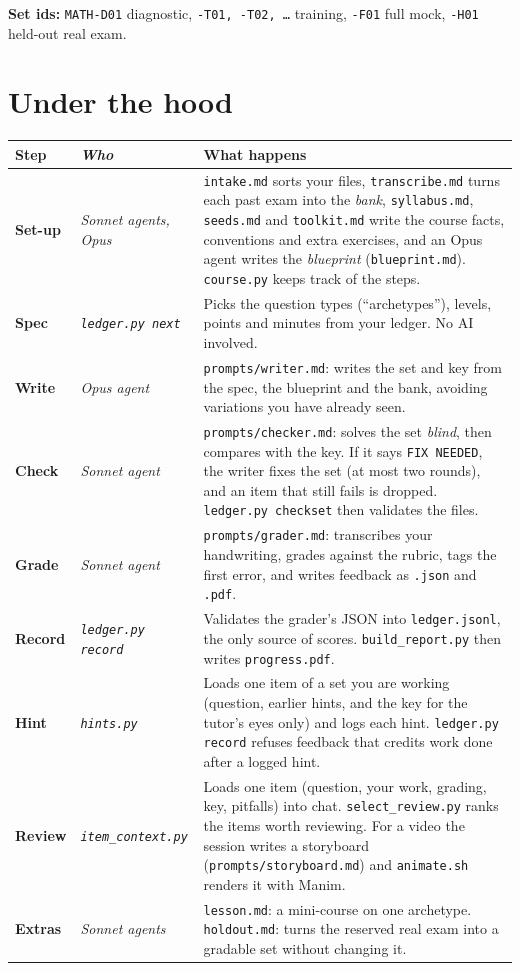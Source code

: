 \documentclass[a4paper,10pt]{article}
\begin{document}
\smallskip
\textbf{Set ids:} \texttt{MATH-D01} diagnostic, \texttt{-T01, -T02, \dots} training,
\texttt{-F01} full mock, \texttt{-H01} held-out real exam.

\section{Under the hood}

\begin{tabularx}{\linewidth}{@{}>{\bfseries}l >{\itshape}l X@{}}
\toprule
Step & Who & What happens \\
\midrule
Set-up & Sonnet agents, Opus & \texttt{intake.md} sorts your files, \texttt{transcribe.md} turns each past exam
  into the \emph{bank}, \texttt{syllabus.md}, \texttt{seeds.md} and \texttt{toolkit.md} write the course facts,
  conventions and extra exercises, and an Opus agent writes the \emph{blueprint} (\texttt{blueprint.md}).
  \texttt{course.py} keeps track of the steps. \\
Spec   & \texttt{ledger.py next} & Picks the question types (``archetypes''), levels, points and minutes from your ledger. No AI involved. \\
Write  & Opus agent & \texttt{prompts/writer.md}: writes the set and key from the spec, the blueprint and
  the bank, avoiding variations you have already seen. \\
Check  & Sonnet agent & \texttt{prompts/checker.md}: solves the set \emph{blind}, then compares with the key. If it says \texttt{FIX NEEDED}, the writer fixes the set (at most two rounds), and an item that still fails is dropped. \texttt{ledger.py checkset} then validates the files. \\
Grade  & Sonnet agent & \texttt{prompts/grader.md}: transcribes your handwriting, grades against the rubric, tags the first error, and writes feedback as \texttt{.json} and \texttt{.pdf}. \\
Record & \texttt{ledger.py record} & Validates the grader's JSON into \texttt{ledger.jsonl}, the only source of scores. \texttt{build\_report.py} then writes \texttt{progress.pdf}. \\
Hint   & \texttt{hints.py} & Loads one item of a set you are working (question, earlier hints, and the key for the tutor's eyes only) and logs each hint. \texttt{ledger.py record} refuses feedback that credits work done after a logged hint. \\
Review & \texttt{item\_context.py} & Loads one item (question, your work, grading, key, pitfalls) into chat. \texttt{select\_review.py} ranks the items worth reviewing. For a video the session writes a storyboard (\texttt{prompts/storyboard.md}) and \texttt{animate.sh} renders it with Manim. \\
Extras & Sonnet agents & \texttt{lesson.md}: a mini-course on one archetype. \texttt{holdout.md}: turns the reserved real exam into a gradable set without changing it. \\
\bottomrule
\end{tabularx}
\end{document}
